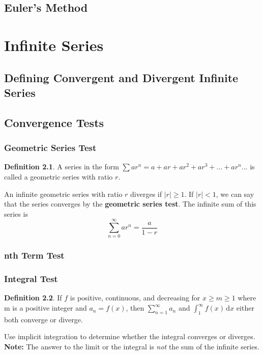 \documentclass[letterpaper]{report}
\theoremstyle{definition}
\newtheorem{definition}{Definition}
\begin{document}
\section{Euler's Method}


\chapter{Infinite Series}

\section{Defining Convergent and Divergent Infinite Series}

\section{Convergence Tests}

\subsection{Geometric Series Test}
\begin{definition}
A series in the form $\sum{ar^n} = a + ar + ar^2 + ar^3 + ... + ar^n ...$
is called a geometric series with ratio $r$.
\end{definition}
An infinite geometric series with ratio $r$ diverges if $|r|\geq1$.
If $|r|<1$, we can say that the series converges by the 
\textbf{geometric series test}. The infinite sum of this series is
\[ \sum_{n=0}^\infty ar^n = \frac{a}{1-r} \]

\subsection{nth Term Test}

\subsection{Integral Test}
\begin{definition}
If $f$ is positive, continuous, and decreasing for $x\geq{}m\geq{}1$ where
m is a positive integer and $a_n=f(x)$, then $\sum_{n=1}^\infty a_n$ and
$\int_1^\infty f(x) \, \mathrm{d}x$ either both converge or diverge.
\end{definition}
Use implicit integration to determine whether the integral converges or diverges.
\textbf{Note:} The answer to the limit or the integral is \textit{not} the 
sum of the infinite series.
\end{document}

